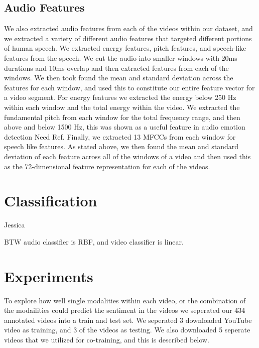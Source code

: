 \documentclass[twoside]{article}
\begin{document}
\begin{multicols}{2}
\subsection{Audio Features}
We also extracted audio features from each of the videos within our dataset, and we extracted a variety of different audio features that targeted different portions of human speech.
We extracted energy features, pitch features, and speech-like features from the speech.
We cut the audio into smaller windows with 20ms durations and 10ms overlap and then extracted features from each of the windows.
We then took found the mean and standard deviation across the features for each window, and used this to constitute our entire feature vector for a video segment.
For energy features we extracted the energy below 250 Hz within each window and the total energy within the video.
We extracted the fundamental pitch from each window for the total frequency range, and then above and below 1500 Hz, this was shown as a useful feature in audio emotion detection {\color{red}Need Ref}.
Finally, we extracted 13 MFCCs from each window for speech like features.
As stated above, we then found the mean and standard deviation of each feature across all of the windows of a video and then used this as the 72-dimensional feature representation for each of the videos.



\section{Classification}
Jessica

BTW audio classifier is RBF, and video classifier is linear.



\section{Experiments}
To explore how well single modalities within each video, or the combination of the modailities could predict the sentiment in the videos we seperated our 434 annotated videos into a train and test set.  We seperated 3 downloaded YouTube video as training, and 3 of the videos as testing.
We also downloaded 5 seperate videos that we utilized for co-training, and this is described below.



\end{multicols}
\end{document}
